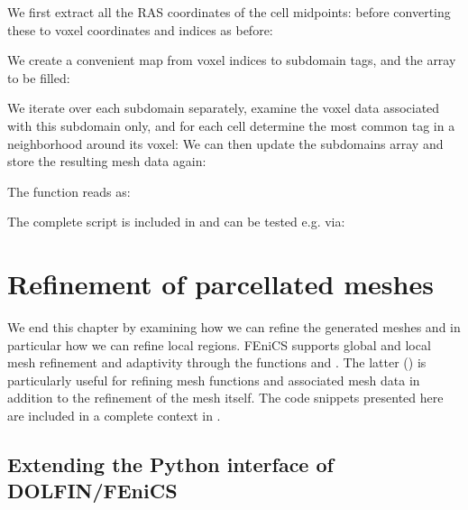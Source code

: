 We first extract all the RAS coordinates of the cell midpoints:
before converting these to voxel coordinates and indices as before:

We create a convenient map from voxel indices to subdomain tags, and
the  array to be filled:

We iterate over each subdomain separately, examine the voxel data
associated with this subdomain only, and for each cell determine the most
common tag in a neighborhood around its voxel:
We can then update the subdomains array
and store the resulting mesh data again:

The  function reads as:

The complete script is included in
 and can be tested e.g. via:

\section{Refinement of parcellated meshes}
\label{sec:chp4:addparcellations}

We end this chapter by examining how we can refine the generated
meshes and in particular how we can refine local regions. FEniCS
supports global and local mesh refinement and adaptivity through the
functions  and . The latter
() is particularly useful for refining mesh
functions and associated mesh data in addition to the refinement of
the mesh itself. The code snippets presented here are included in
a complete context in . 

\subsection{Extending the Python interface of DOLFIN/FEniCS}

